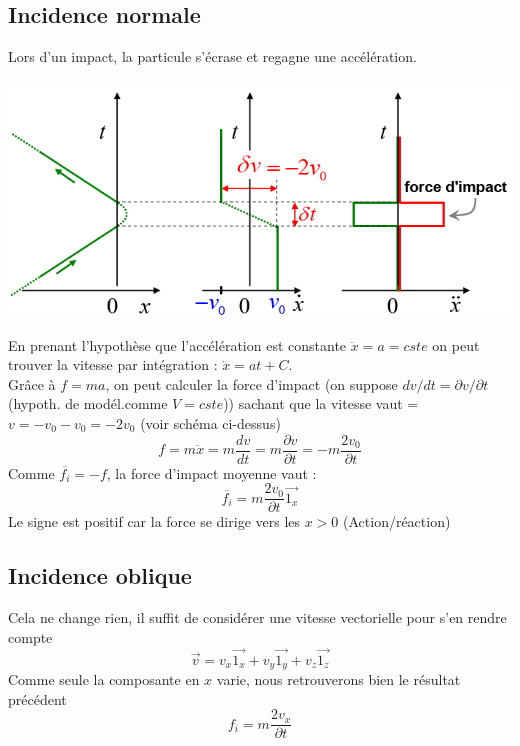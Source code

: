 \documentclass	[11pt, a4paper, openany]{book}
\begin{document}
\subsection{Incidence normale}
Lors d'un impact, la particule s'écrase et regagne une accélération.
\begin{center}
\includegraphics[scale=0.4]{th/image6.png}
\end{center}
En prenant l'hypothèse que l'accélération est constante $\ddot{x} = a = cste$ on peut trouver la vitesse par intégration  : $\dot{x} = at + C$.\\
Grâce à $f = ma$, on peut calculer la force d'impact (on suppose $dv/dt = \partial v / \partial t$ (hypoth. de modél.comme $V = cste$)) sachant que la vitesse vaut = $v = -v_0 - v_0 = -2v_0$ (voir schéma ci-dessus)
\begin{equation}
f = m\ddot{x} = m\frac{dv}{dt} = m\frac{\partial v}{\partial t} = -m\frac{2v_0}{\partial t}
\end{equation}
Comme $\overline{f_i} = -f$, la force d'impact moyenne vaut :
\begin{equation}
\overline{f_i} = m \frac{2v_0}{\partial t}\vec{1_x}
\end{equation}
Le signe est positif car la force se dirige vers les $x > 0$  (Action/réaction)

\subsection{Incidence oblique}
Cela ne change rien, il suffit de considérer une vitesse vectorielle pour s'en rendre compte
\begin{equation}
\vec v = v_x \vec{1_x} + v_y \vec{1_y} + v_z \vec{1_z}
\end{equation}
Comme seule la composante en $x$ varie, nous retrouverons bien le résultat précédent 
\begin{equation}
f_i = m\frac{2v_x}{\partial t}
\end{equation}
\end{document}
